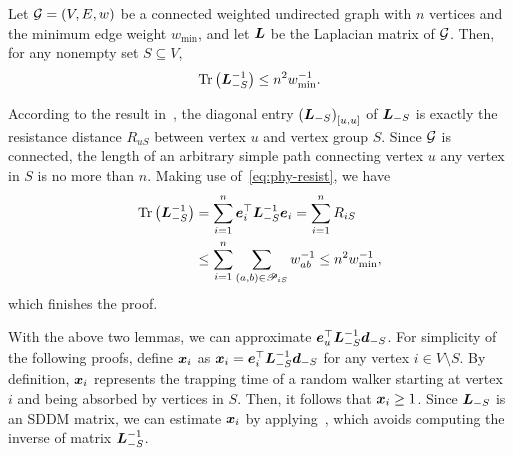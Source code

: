 \documentclass[10pt,twocolumn,twoside]{IEEEtran}
\begin{document}
\begin{lemma}\label{lem:trace-lap}
    Let \(\mathcal{G}=(V,E,w)\) be a connected weighted undirected graph with \(n\) vertices and the minimum edge weight $ w_{\min}$, and let \(\boldsymbol{L}\) be the Laplacian matrix of \(\mathcal{G}\). Then, for any nonempty set \(S\subseteq V\),
    \begin{equation*}
        \mathrm{Tr}\left(\boldsymbol{L}_{-S}^{-1}\right)\le n^2w_{\min}^{-1}.
    \end{equation*}
\end{lemma}
\begin{IEEEproof}
    According to the result in~\cite{ClPo11}, the diagonal entry \(\left( \boldsymbol{L}_{-S} \right)_{[u,u]}\) of \(\boldsymbol{L}_{-S}\) is exactly the resistance distance \(R_{uS}\) between vertex \(u\) and vertex group \(S\).  Since \(\mathcal{G}\) is connected, the length of an arbitrary simple path connecting vertex \(u\) any vertex in \(S\) is no more than \(n\).
    Making use of~\eqref{eq:phy-resist}, we have
    \begin{align*}
        \mathrm{Tr}\left(\boldsymbol{L}_{-S}^{-1}\right) & =\sum_{i=1}^n\boldsymbol{e}_i^\top\boldsymbol{L}_{-S}^{-1}\boldsymbol{e}_i=\sum_{i=1}^nR_{iS}              \\
                               & \le\sum_{i=1}^n\sum_{\left( a,b \right)\in\mathscr{P}_{iS}}w_{ab}^{-1}\le n^2w_{\min}^{-1},
    \end{align*}
    which finishes the proof.
\end{IEEEproof}

With the above two lemmas, we can approximate \(\boldsymbol{e}_u^\top\boldsymbol{L}_{-S}^{-1}\boldsymbol{d}_{-S}\). For simplicity of the following proofs, define $\boldsymbol{x}_i $ as \(\boldsymbol{x}_i=\boldsymbol{e}_i^\top\boldsymbol{L}_{-S}^{-1}\boldsymbol{d}_{-S}\) for any vertex \(i\in V\setminus S\). By definition, $\boldsymbol{x}_i $ represents the trapping time of a random walker starting at vertex \(i\) and being absorbed by  vertices in $S$. Then, it follows that \(\boldsymbol{x}_i\ge1\). Since \(\boldsymbol{L}_{-S}\) is an SDDM matrix, we can estimate $\boldsymbol{x}_i $ by applying~, which avoids computing the inverse of matrix \(\boldsymbol{L}_{-S}^{-1}\).
\end{document}
